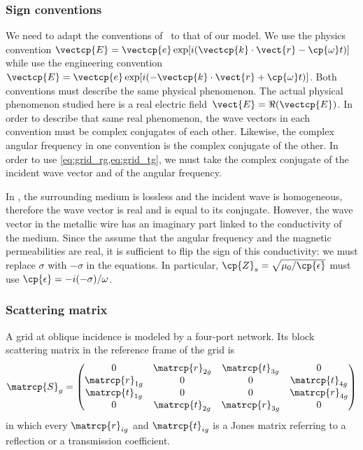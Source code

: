 \begin{refsection}
\subsubsection{Sign conventions}
We need to adapt the conventions of~\textcite{houde_2001} to that of our model.
We use the physics convention
$\vectcp{E}=\vectcp{e} \exp[i(\vectcp{k}\cdot \vect{r} - \cp{\omega}t)]$
while \citeauthor{houde_2001} use the engineering convention
$\vectcp{E}=\vectcp{e} \exp[i(-\vectcp{k}\cdot \vect{r} + \cp{\omega}t)]$.
Both conventions must describe the same physical phenomenon.
The actual physical phenomenon studied here is a
real electric field~$\vect{E} = \Re(\vectcp{E})$.
In order to describe that same real phenomenon, the wave vectors in each convention must be complex conjugates of each other.
Likewise, the complex angular frequency in one convention is the complex conjugate of the other.
In order to use \cref{eq:grid_rg,eq:grid_tg}, we must take the complex conjugate of the incident wave vector and of the angular frequency.

In \textcite{houde_2001}, the surrounding medium is lossless and the incident wave is homogeneous, therefore the wave vector is real and is equal to its conjugate.
However, the wave vector in the metallic wire has an imaginary part linked to the conductivity of the medium.
Since the \citeauthor{houde_2001} assume that the angular frequency and the magnetic permeabilities are real, it is sufficient to flip the sign of this conductivity: we must replace $\sigma$ with $-\sigma$ in the equations.
In particular, $\cp{Z}_s = \sqrt{\mu_0 / \cp{\epsilon}}$ must use
$\cp{\epsilon} = -i (-\sigma) / \omega$.

\subsubsection{Scattering matrix}
A grid at oblique incidence is modeled by a four-port network.
Its block scattering matrix in the reference frame of the grid is
\begin{equation}
    \matrcp{S}_g
    =
    \begin{pmatrix}
        0               & \matrcp{r}_{2g} & \matrcp{t}_{3g} & 0               \\
        \matrcp{r}_{1g} & 0               & 0               & \matrcp{t}_{4g} \\
        \matrcp{t}_{1g} & 0               & 0               & \matrcp{r}_{4g} \\
        0               & \matrcp{t}_{2g} & \matrcp{r}_{3g} & 0
    \end{pmatrix}
    \label{eq:grid_scattering_local}
\end{equation}
in which every $\matrcp{r}_{ig}$ and $\matrcp{t}_{ig}$ is a Jones matrix referring to a reflection or a transmission coefficient.


\end{refsection}
